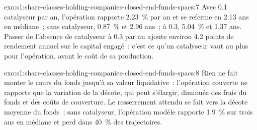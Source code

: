 \begin{solution}{exo:s1:share-classes-holding-companies-closed-end-funds-spacs:7}
Avec 0.1 catalyseur par an, l'opération rapporte 2.23~\% par an et se referme en 2.13 ans en médiane~; sans catalyseur, 0.87~\% et 2.96 ans~; à 0.3, 5.04~\% et 1.37
ans. Passer de l'absence de catalyseur à 0.3 par an ajoute environ 4.2 points de rendement annuel sur le capital engagé~: c'est ce qu'un catalyseur vaut au plus pour l'opération, avant le coût de
sa production.
\end{solution}

\begin{solution}{exo:s1:share-classes-holding-companies-closed-end-funds-spacs:8}
Rien ne fait monter le cours du fonds jusqu'à sa valeur liquidative~: l'opération couverte ne rapporte que la variation de la décote, qui peut s'élargir, diminuée des frais du fonds et
des coûts de couverture. Le resserrement attendu se fait vers la décote moyenne du fonds~; sans catalyseur, l'opération modèle rapporte 1.9~\% sur trois ans en médiane et
perd dans 40~\% des trajectoires.
\end{solution}


